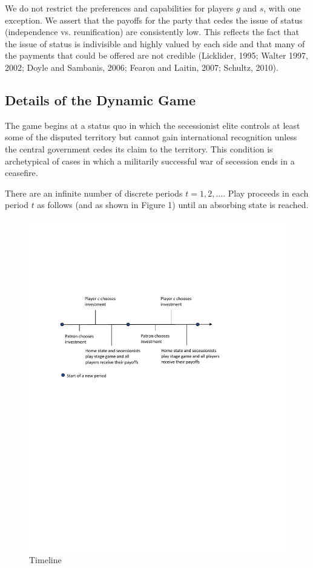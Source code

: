 We do not restrict the preferences and capabilities for players $g$ and $s$, with one exception. We assert that the payoffs for the party that cedes the issue of status (independence vs. reunification) are consistently low. This reflects the fact that the issue of status is indivisible and highly valued by each side and that many of the payments that could be offered are not credible (Licklider, 1995; Walter 1997, 2002; Doyle and Sambanis, 2006; Fearon and Laitin, 2007; Schultz, 2010).


\subsection{Details of the Dynamic Game}
\label{sec:structure}

The game begins at a status quo in which the secessionist elite controls at least some of the disputed territory but cannot gain international recognition unless the central government cedes its claim to the territory. This condition is archetypical of cases in which a militarily successful war of secession ends in a ceasefire.  

There are an infinite number of discrete periods $t=1,2,\ldots$. Play proceeds in each period $t$ as follows (and as shown in Figure 1) until an absorbing state is reached.

\begin{figure}
\includegraphics{Timeline2.pdf}
\caption{Timeline}
\end{figure}

